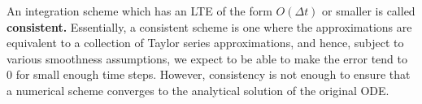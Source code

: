 \documentclass[
  letterpaper,
  DIV=11,
  numbers=noendperiod]{scrreprt}
\begin{document}
An integration scheme which has an LTE of the form \(O(\Delta t)\) or
smaller is called \textbf{consistent.} Essentially, a consistent scheme
is one where the approximations are equivalent to a collection of Taylor
series approximations, and hence, subject to various smoothness
assumptions, we expect to be able to make the error tend to \(0\) for
small enough time steps. However, consistency is not enough to ensure
that a numerical scheme converges to the analytical solution of the
original ODE.
\end{document}
